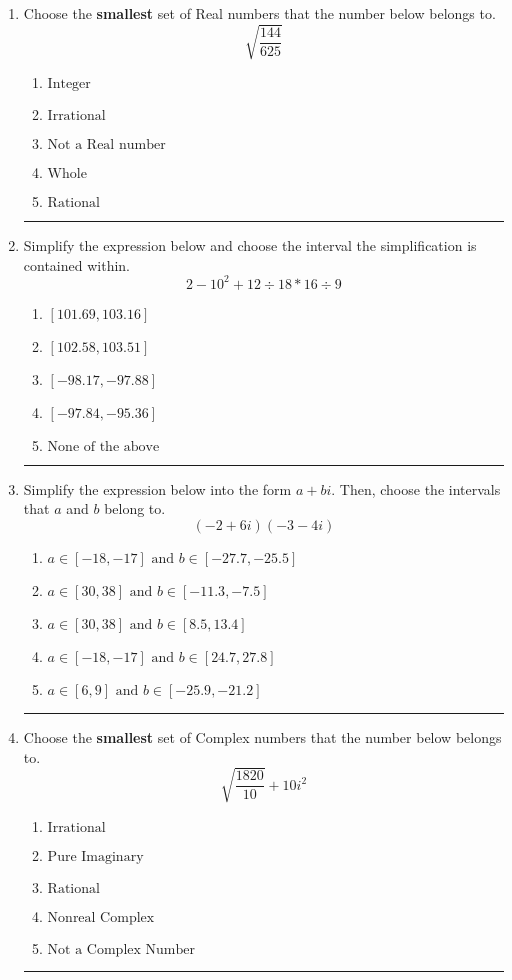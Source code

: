 \documentclass[14pt]{extbook}
\newcommand{\litem}[1]{\item#1\hspace*{-1cm}\rule{\textwidth}{0.4pt}}
\begin{document}
\begin{enumerate}
{\begin{enumerate}[label=\Alph*.]
\end{enumerate} }
\litem{
Choose the \textbf{smallest} set of Real numbers that the number below belongs to.\[ \sqrt{\frac{144}{625}} \]\begin{enumerate}[label=\Alph*.]
\item \( \text{Integer} \)
\item \( \text{Irrational} \)
\item \( \text{Not a Real number} \)
\item \( \text{Whole} \)
\item \( \text{Rational} \)

\end{enumerate} }
\litem{
Simplify the expression below and choose the interval the simplification is contained within.\[ 2 - 10^2 + 12 \div 18 * 16 \div 9 \]\begin{enumerate}[label=\Alph*.]
\item \( [101.69, 103.16] \)
\item \( [102.58, 103.51] \)
\item \( [-98.17, -97.88] \)
\item \( [-97.84, -95.36] \)
\item \( \text{None of the above} \)

\end{enumerate} }
\litem{
Simplify the expression below into the form $a+bi$. Then, choose the intervals that $a$ and $b$ belong to.\[ (-2 + 6 i)(-3 - 4 i) \]\begin{enumerate}[label=\Alph*.]
\item \( a \in [-18, -17] \text{ and } b \in [-27.7, -25.5] \)
\item \( a \in [30, 38] \text{ and } b \in [-11.3, -7.5] \)
\item \( a \in [30, 38] \text{ and } b \in [8.5, 13.4] \)
\item \( a \in [-18, -17] \text{ and } b \in [24.7, 27.8] \)
\item \( a \in [6, 9] \text{ and } b \in [-25.9, -21.2] \)

\end{enumerate} }
\litem{
Choose the \textbf{smallest} set of Complex numbers that the number below belongs to.\[ \sqrt{\frac{1820}{10}}+10i^2 \]\begin{enumerate}[label=\Alph*.]
\item \( \text{Irrational} \)
\item \( \text{Pure Imaginary} \)
\item \( \text{Rational} \)
\item \( \text{Nonreal Complex} \)
\item \( \text{Not a Complex Number} \)


\end{enumerate}}
\end{enumerate}
\end{document}
